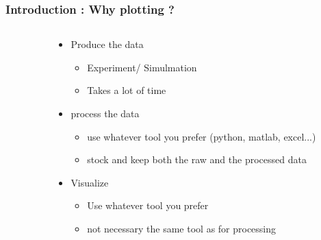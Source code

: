 \documentclass[sans, aspectratio=169]{beamer}
\begin{document}
\begin{frame} 
	\frametitle{Introduction : Why plotting ?} 

	\begin{columns}
	\begin{column}{0.35\linewidth}

		\begin{center}
	    \end{center}
	\end{column}
		\pause
	\begin{column}{0.70\linewidth}
	\begin{itemize}
		\item Produce the data
			\begin{itemize}
			\item Experiment/ Simulmation
			\item Takes a lot of time
			\end{itemize}
		\item process the data
			\begin{itemize}
			\item use whatever tool you prefer (python, matlab, excel...)
			\item stock and keep both the raw and the processed data 
			\end{itemize}
		\item Visualize
			\begin{itemize}
			\item Use whatever tool you prefer
			\item not necessary the same tool as for processing
			\end{itemize}
		\end{itemize}
		
	\end{column}
		
	\end{columns}
\end{frame}
\end{document}
